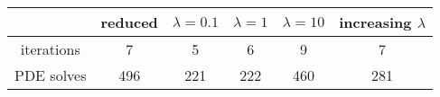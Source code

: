 \begin{tabular}{cccccc}
& reduced & $\lambda = 0.1$ & $\lambda = 1$ & $\lambda = 10$ & increasing $\lambda$ \\
\hline
iterations & 7 & 5 & 6 & 9 & 7 \\
PDE solves & 496 & 221 & 222 & 460 & 281 \\
\hline
\end{tabular}
